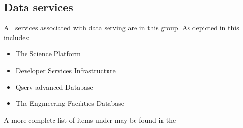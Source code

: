 \subsection{ Data services} \label{sec:servingdata}

All services associated with data serving are in this group.
As depicted in  this includes:

\begin{itemize}
\item The Science Platform
\item Developer Services Infrastructure
\item Qserv advanced Database
\item The Engineering Facilities Database
\end{itemize}

A more complete list of items under may be found in the 
